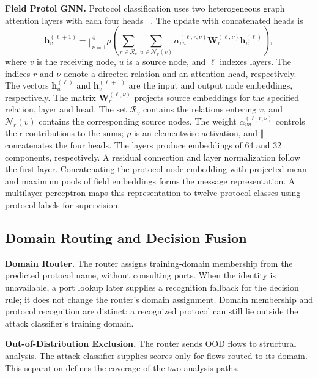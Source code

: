 \documentclass{article}
\begin{document}
\textbf{Field Protol GNN.} Protocol classification uses two heterogeneous graph
attention layers with each four heads ~\cite{velickovic2018gat}. The update with
concatenated heads is
\begin{equation}
\mathbf{h}_v^{(\ell+1)}=
\mathop{\Vert}_{\nu=1}^{4}\rho\!\left(
\sum_{r\in\mathcal{R}_v}\sum_{u\in\mathcal{N}_r(v)}
\alpha_{vu}^{(\ell,r,\nu)}\mathbf{W}_r^{(\ell,\nu)}\mathbf{h}_u^{(\ell)}
\right),
\label{eq:gat}
\end{equation}
where $v$ is the receiving node, $u$ is a source node, and $\ell$ indexes layers.
The indices $r$ and $\nu$ denote a directed relation and an attention head,
respectively. The vectors $\mathbf{h}_u^{(\ell)}$ and
$\mathbf{h}_v^{(\ell+1)}$ are the input and output node embeddings, respectively.
The matrix $\mathbf{W}_r^{(\ell,\nu)}$ projects source embeddings for the specified
relation, layer and head. The set $\mathcal{R}_v$ contains the relations entering
$v$, and $\mathcal{N}_r(v)$ contains the corresponding source nodes. The weight
$\alpha_{vu}^{(\ell,r,\nu)}$ controls their contributions to the sums;
$\rho$ is an elementwise activation, and $\Vert$ concatenates the four heads.
The layers produce embeddings of 64 and 32 components, respectively. A residual
connection and layer normalization follow the first layer. Concatenating the
protocol node embedding with projected mean and maximum pools of field embeddings
forms the message representation. A multilayer perceptron maps this representation
to twelve protocol classes using protocol labels for supervision.

\subsection{Domain Routing and Decision Fusion}
\label{ssec:fusion}

\textbf{Domain Router.} The router assigns training-domain membership from the
predicted protocol name, without consulting ports. When the identity is unavailable,
a port lookup later supplies a recognition fallback for the decision rule; it does
not change the router's domain assignment. Domain membership and protocol recognition
are distinct: a recognized protocol can still lie outside the attack classifier's
training domain.

\textbf{Out-of-Distribution Exclusion.} The router sends OOD flows to structural
analysis. The attack classifier supplies scores only for flows routed to its domain.
This separation defines the coverage of the two analysis paths.
\end{document}
